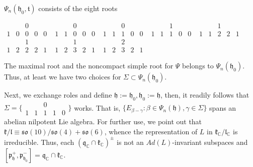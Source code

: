 \documentclass[12pt]{amsart}
\theoremstyle{definition}
\theoremstyle{remark}
\newcommand{\h}{\mathfrak{h}}
\renewcommand{\k}{{\mathfrak k}}
\renewcommand{\l}{\mathfrak l}
\newcommand{\p}{\mathfrak p}
\newcommand{\q}{\mathfrak q}
\renewcommand{\t}{{\mathfrak t}}
\newcommand{\C}{{\mathbb C}}
\numberwithin{equation}{section}
\begin{document}
   $\Psi_n(\h_0 ,\t)$ consists of the eight roots


$
\begin{smallmatrix}
    &   & 0 &   &   \\
  1& 0 & 0 & 0 & 0
\end{smallmatrix}
$
$\begin{smallmatrix}
   &  & 0 &   &  \\
   1 & 1 & 0 & 0 & 0
 \end{smallmatrix}
 $
$\begin{smallmatrix}
   &  &  0 &   &  \\
   1 & 1 & 1 & 0 & 0
 \end{smallmatrix}
 $
 $\begin{smallmatrix}
   &  &  1 &   &  \\
   1 & 1 & 1 & 0 & 0
 \end{smallmatrix}
 $
 $\begin{smallmatrix}
   &  &  1 &   &  \\
   1 & 1 & 2 & 2 & 1
 \end{smallmatrix}
 $
 $\begin{smallmatrix}
   &  &  1 &   &  \\
   1 & 2 & 2 & 2 & 1
 \end{smallmatrix}
 $
 $\begin{smallmatrix}
   &  &  1 &   &  \\
   1 & 2 & 3 & 2 & 1
 \end{smallmatrix}
 $
 $\begin{smallmatrix}
   &  &  2 &   &  \\
   1 & 2 & 3 & 2 & 1
 \end{smallmatrix}
 $


 The maximal root and the noncompact simple root for $\Psi$ belongs to $\Psi_n(\h_0)$. Thus, at least we have two choices for $\Sigma \subset \Psi_n(\h_0)$.

 Next, we exchange roles and define $\h:=\h_0, \h_0:=\h$, then, it readily follows that $\Sigma =\{
\begin{smallmatrix}
    &   & 0 &   &   \\
  1& 1 & 1 & 1 & 0
\end{smallmatrix}\} $ works. That is, $\{E_{\beta -\gamma} : \beta \in \Psi_n(\h), \gamma \in \Sigma\}$ spans an abelian nilpotent Lie algebra. For further use, we point out that $\k/\l \equiv \mathfrak{so}(10)/\mathfrak{so}(4)+\mathfrak{so}(6)$, whence the representation of $L$ in $\k_\C/\l_\C$ is irreducible. Thus, each $(\q_\C \cap \k_\C)^\pm$ is not an $Ad(L)$-invariant subspaces and $[\p_\h^+,\p_{\h_0}^-]= \q_\C \cap \k_\C$.
\end{document}
